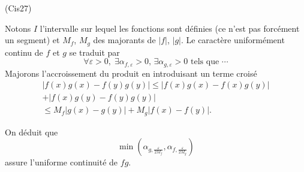 \begin{tiny}(Cis27)\end{tiny} Notons $I$ l'intervalle sur lequel les fonctions sont définies (ce n'est pas forcément un segment) et $M_f$, $M_g$ des majorants de $|f|$, $|g|$. Le caractère uniformément continu de $f$ et $g$ se traduit par
\[
  \forall \varepsilon >0, \; \exists \alpha_{f, \varepsilon}>0, \, \exists \alpha_{g,\varepsilon}> 0 \text{ tels que } \cdots 
\]
Majorons l'accroissement du produit en introduisant un terme croisé
\begin{multline*}
\left|f(x)g(x) - f(y)g(y)\right| \leq \left|f(x)g(x) - f(x)g(y)\right| \\
+ \left|f(x)g(y) - f(y)g(y)\right| \\
 \leq M_f \left|g(x) - g(y)\right| + M_g \left|f(x) - f(y)\right| .
\end{multline*}

On déduit que
\[
 \min(\alpha_{g,\frac{\varepsilon}{2M_f}}, \alpha_{f,\frac{\varepsilon}{2M_g}})
\]
assure l'uniforme continuité de $fg$.
 


